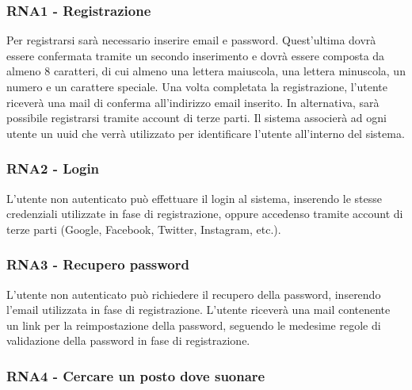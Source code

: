 \documentclass[12pt, a4paper]{article}
\begin{document}
\subsubsection*{\hypertarget{RNA1}{RNA1 - Registrazione}}

Per registrarsi sarà necessario inserire email e password.
Quest'ultima dovrà essere confermata tramite un secondo inserimento e dovrà essere composta da almeno 8 caratteri, di cui almeno una lettera maiuscola, una lettera minuscola, un numero e un carattere speciale. Una volta completata la registrazione, l'utente riceverà una mail di conferma all'indirizzo email inserito. In alternativa, sarà possibile registrarsi tramite account di terze parti.
Il sistema associerà ad ogni utente un uuid che verrà utilizzato per identificare l'utente all'interno del sistema.


\subsubsection*{\hypertarget{RNA2}{RNA2 - Login}}

L'utente non autenticato può effettuare il login al sistema, inserendo le stesse credenziali utilizzate in fase di registrazione, oppure accedenso tramite account di terze parti (Google, Facebook, Twitter, Instagram, etc.).

\subsubsection*{\hypertarget{RNA3}{RNA3 - Recupero password}}

L'utente non autenticato può richiedere il recupero della password, inserendo l'email utilizzata in fase di registrazione. L'utente riceverà una mail contenente un link per la reimpostazione della password, seguendo le medesime regole di validazione della password in fase di registrazione.

\subsubsection*{\hypertarget{RNA4}{RNA4 - Cercare un posto dove suonare}}
\end{document}

